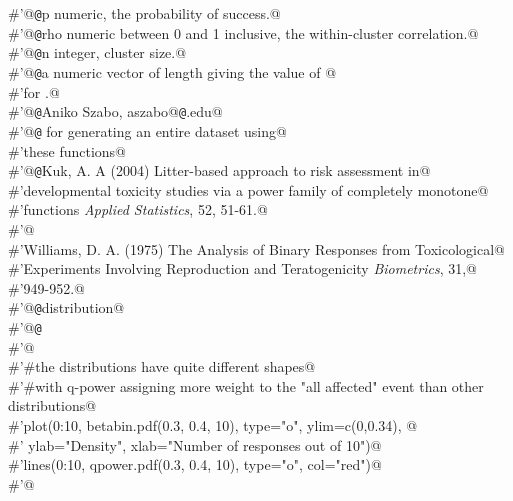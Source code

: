 \documentclass[reqno]{amsart}
\begin{document}
\begin{flushleft}
\begin{minipage}{\linewidth}
\begin{list}{}{}
\mbox{}\verb@#'@{\tt @}\verb@param p numeric, the probability of success.@\\
\mbox{}\verb@#'@{\tt @}\verb@param rho numeric between 0 and 1 inclusive, the within-cluster correlation.@\\
\mbox{}\verb@#'@{\tt @}\verb@param n integer, cluster size.@\\
\mbox{}\verb@#'@{\tt @}\verb@return a numeric vector of length  giving the value of @\\
\mbox{}\verb@#'for .@\\
\mbox{}\verb@#'@{\tt @}\verb@author Aniko Szabo, aszabo@{\tt @}\verb@mcw.edu@\\
\mbox{}\verb@#'@{\tt @}\verb@seealso {} for generating an entire dataset using@\\
\mbox{}\verb@#'these functions@\\
\mbox{}\verb@#'@{\tt @}\verb@references Kuk, A. A (2004) Litter-based approach to risk assessment in@\\
\mbox{}\verb@#'developmental toxicity studies via a power family of completely monotone@\\
\mbox{}\verb@#'functions \emph{Applied Statistics}, 52, 51-61.@\\
\mbox{}\verb@#'@\\
\mbox{}\verb@#'Williams, D. A. (1975) The Analysis of Binary Responses from Toxicological@\\
\mbox{}\verb@#'Experiments Involving Reproduction and Teratogenicity \emph{Biometrics}, 31,@\\
\mbox{}\verb@#'949-952.@\\
\mbox{}\verb@#'@{\tt @}\verb@keywords distribution@\\
\mbox{}\verb@#'@{\tt @}\verb@examples@\\
\mbox{}\verb@#'@\\
\mbox{}\verb@#'#the distributions have quite different shapes@\\
\mbox{}\verb@#'#with q-power assigning more weight to the "all affected" event than other distributions@\\
\mbox{}\verb@#'plot(0:10, betabin.pdf(0.3, 0.4, 10), type="o", ylim=c(0,0.34), @\\
\mbox{}\verb@#'   ylab="Density", xlab="Number of responses out of 10")@\\
\mbox{}\verb@#'lines(0:10, qpower.pdf(0.3, 0.4, 10), type="o", col="red")@\\
\mbox{}\verb@#'@\\

\end{list}
\end{minipage}
\end{flushleft}
\end{document}
